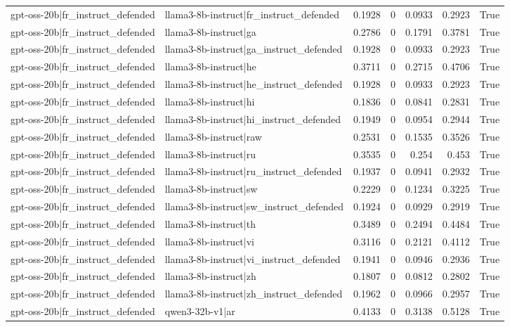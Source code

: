 \begin{table}
\begin{tabular}{l l r r r r l}
gpt-oss-20b|fr_instruct_defended & llama3-8b-instruct|fr_instruct_defended & 0.1928 & 0 & 0.0933 & 0.2923 & True \\
gpt-oss-20b|fr_instruct_defended & llama3-8b-instruct|ga & 0.2786 & 0 & 0.1791 & 0.3781 & True \\
gpt-oss-20b|fr_instruct_defended & llama3-8b-instruct|ga_instruct_defended & 0.1928 & 0 & 0.0933 & 0.2923 & True \\
gpt-oss-20b|fr_instruct_defended & llama3-8b-instruct|he & 0.3711 & 0 & 0.2715 & 0.4706 & True \\
gpt-oss-20b|fr_instruct_defended & llama3-8b-instruct|he_instruct_defended & 0.1928 & 0 & 0.0933 & 0.2923 & True \\
gpt-oss-20b|fr_instruct_defended & llama3-8b-instruct|hi & 0.1836 & 0 & 0.0841 & 0.2831 & True \\
gpt-oss-20b|fr_instruct_defended & llama3-8b-instruct|hi_instruct_defended & 0.1949 & 0 & 0.0954 & 0.2944 & True \\
gpt-oss-20b|fr_instruct_defended & llama3-8b-instruct|raw & 0.2531 & 0 & 0.1535 & 0.3526 & True \\
gpt-oss-20b|fr_instruct_defended & llama3-8b-instruct|ru & 0.3535 & 0 & 0.254 & 0.453 & True \\
gpt-oss-20b|fr_instruct_defended & llama3-8b-instruct|ru_instruct_defended & 0.1937 & 0 & 0.0941 & 0.2932 & True \\
gpt-oss-20b|fr_instruct_defended & llama3-8b-instruct|sw & 0.2229 & 0 & 0.1234 & 0.3225 & True \\
gpt-oss-20b|fr_instruct_defended & llama3-8b-instruct|sw_instruct_defended & 0.1924 & 0 & 0.0929 & 0.2919 & True \\
gpt-oss-20b|fr_instruct_defended & llama3-8b-instruct|th & 0.3489 & 0 & 0.2494 & 0.4484 & True \\
gpt-oss-20b|fr_instruct_defended & llama3-8b-instruct|vi & 0.3116 & 0 & 0.2121 & 0.4112 & True \\
gpt-oss-20b|fr_instruct_defended & llama3-8b-instruct|vi_instruct_defended & 0.1941 & 0 & 0.0946 & 0.2936 & True \\
gpt-oss-20b|fr_instruct_defended & llama3-8b-instruct|zh & 0.1807 & 0 & 0.0812 & 0.2802 & True \\
gpt-oss-20b|fr_instruct_defended & llama3-8b-instruct|zh_instruct_defended & 0.1962 & 0 & 0.0966 & 0.2957 & True \\
gpt-oss-20b|fr_instruct_defended & qwen3-32b-v1|ar & 0.4133 & 0 & 0.3138 & 0.5128 & True \\

\end{tabular}
\end{table}
